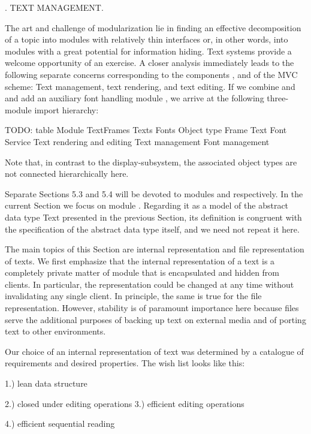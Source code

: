 . TEXT MANAGEMENT.

The art and challenge of modularization lie in finding an effective
decomposition of a topic into modules with relatively thin interfaces
or, in other words, into modules with a great potential for
information hiding. Text systems provide a welcome opportunity of an
exercise. A closer analysis immediately leads to the following
separate concerns corresponding to the components ,  and
 of the MVC scheme: Text management, text rendering, and
text editing. If we combine  and  and add an auxiliary
font handling module , we arrive at the following three-module
import hierarchy:

TODO: table
Module
TextFrames Texts
Fonts
Object type
Frame Text Font
Service
Text rendering and editing Text management
Font management

Note that, in contrast to the display-subsystem, the associated object
types are not connected hierarchically here.

Separate Sections 5.3 and 5.4 will be devoted to modules 
and  respectively. In the current Section
we focus on module . Regarding it as a model of the
abstract data type Text presented in the previous Section, its
definition is congruent with the specification of the abstract data
type itself, and we need not repeat it here.

The main topics of this Section are internal representation and file
representation of texts. We first emphasize that the internal
representation of a text is a completely private matter of module
 that is encapsulated and hidden from clients. In particular, the
representation could be changed at any time without invalidating any
single client. In principle, the same is true for the file
representation. However, stability is of paramount importance here
because files serve the additional purposes of backing up text on
external media and of porting text to other environments.

Our choice of an internal representation of text was determined by a catalogue of requirements and desired properties. The wish list looks like this:

1.) lean data structure

2.) closed under editing operations 3.) efficient editing operations

4.) efficient sequential reading

